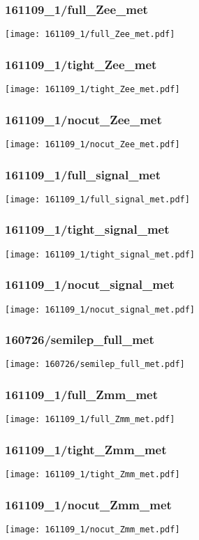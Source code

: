 \begin{frame}
   \frametitle{\small 161109\_1/full\_Zee\_met}
   \centering
   \texttt{[image: 161109\_1/full\_Zee\_met.pdf]}
\end{frame}

\begin{frame}
   \frametitle{\small 161109\_1/tight\_Zee\_met}
   \centering
   \texttt{[image: 161109\_1/tight\_Zee\_met.pdf]}
\end{frame}

\begin{frame}
   \frametitle{\small 161109\_1/nocut\_Zee\_met}
   \centering
   \texttt{[image: 161109\_1/nocut\_Zee\_met.pdf]}
\end{frame}

\begin{frame}
   \frametitle{\small 161109\_1/full\_signal\_met}
   \centering
   \texttt{[image: 161109\_1/full\_signal\_met.pdf]}
\end{frame}

\begin{frame}
   \frametitle{\small 161109\_1/tight\_signal\_met}
   \centering
   \texttt{[image: 161109\_1/tight\_signal\_met.pdf]}
\end{frame}

\begin{frame}
   \frametitle{\small 161109\_1/nocut\_signal\_met}
   \centering
   \texttt{[image: 161109\_1/nocut\_signal\_met.pdf]}
\end{frame}

\begin{frame}
   \frametitle{\small 160726/semilep\_full\_met}
   \centering
   \texttt{[image: 160726/semilep\_full\_met.pdf]}
\end{frame}

\begin{frame}
   \frametitle{\small 161109\_1/full\_Zmm\_met}
   \centering
   \texttt{[image: 161109\_1/full\_Zmm\_met.pdf]}
\end{frame}

\begin{frame}
   \frametitle{\small 161109\_1/tight\_Zmm\_met}
   \centering
   \texttt{[image: 161109\_1/tight\_Zmm\_met.pdf]}
\end{frame}

\begin{frame}
   \frametitle{\small 161109\_1/nocut\_Zmm\_met}
   \centering
   \texttt{[image: 161109\_1/nocut\_Zmm\_met.pdf]}
\end{frame}

